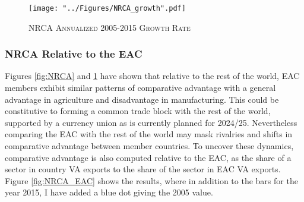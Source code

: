 \documentclass[a4paper]{article}
\begin{document}


\begin{figure}[h!]
\centering
\caption{\label{fig:NRCA_growth}\textsc{NRCA Annualized 2005-2015 Growth Rate}}
\texttt{[image: "../Figures/NRCA\_growth".pdf]} %
\end{figure}
\FloatBarrier



\subsubsection{NRCA Relative to the EAC}
Figures \ref{fig:NRCA} and \ref{fig:NRCA_growth} have shown that relative to the rest of the world, EAC members exhibit similar patterns of comparative advantage with a general advantage in agriculture and disadvantage in manufacturing. This could be constitutive to forming a common trade block with the rest of the world, supported by a currency union as is currently planned for 2024/25. Nevertheless comparing the EAC with the rest of the world may mask rivalries and shifts in comparative advantage between member countries. To uncover these dynamics, comparative advantage is also computed relative to the EAC, as the share of a sector in country VA exports to the share of the sector in EAC VA exports. %
Figure \ref{fig:NRCA_EAC} shows the results, where in addition to the bars for the year 2015, I have added a blue dot giving the 2005 value. \newline %
\end{document}
